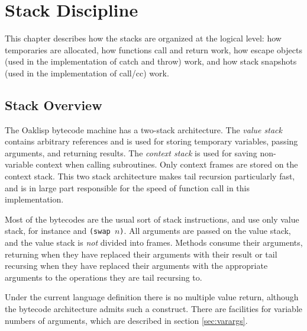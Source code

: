 %
%
%


\chapter{Stack Discipline}

This chapter describes how the stacks are organized at the logical
level: how temporaries are allocated, how functions call and return
work, how escape objects (used in the implementation of catch and
throw) work, and how stack snapshots (used in the implementation of
call/cc) work.

\section{Stack Overview}

The Oaklisp bytecode machine has a two-stack architecture.  The 
\emph{value stack} contains arbitrary references and is used for storing
temporary variables, passing arguments, and returning results.  The
\emph{context stack} is used for saving non-variable context when
calling subroutines.  Only context frames are stored on the context
stack.  This two stack architecture makes tail recursion particularly
fast, and is in large part responsible for the speed of function call
in this implementation.

Most of the bytecodes are the usual sort of stack instructions, and
use only value stack, for instance  and \texttt{(swap
$n$)}.  All arguments are passed on the value stack,
and the value stack is \emph{not} divided into frames.  Methods consume
their arguments, returning when they have replaced their arguments
with their result or tail recursing when they have replaced their
arguments with the appropriate arguments to the operations they are
tail recursing to.

Under the current language definition there is no multiple value
return, although the bytecode architecture admits such a construct.
There are facilities for variable numbers of arguments, which are
described in section \ref{sec:varargs}.


